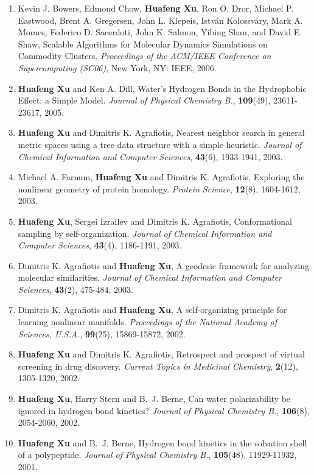 \documentclass[11pt]{article}
\begin{document}
\begin{enumerate}
\item
Kevin J. Bowers, Edmond Chow, \textbf{Huafeng Xu}, Ron O. Dror, Michael P. Eastwood, Brent A. Gregersen, John L. Klepeis, István Kolossváry, Mark A. Moraes, Federico D. Sacerdoti, John K. Salmon, Yibing Shan, and David E. Shaw, Scalable Algorithms for Molecular Dynamics Simulations on Commodity Clusters. \textit{Proceedings of the ACM/IEEE Conference on Supercomputing (SC06)}, New York, NY: IEEE, 2006.
\item
\textbf{Huafeng Xu} and Ken A. Dill, Water's Hydrogen Bonds in the Hydrophobic Effect: a Simple Model. \textit{Journal of Physical Chemistry B.}, \textbf{109}(49), 23611-23617, 2005.
\item
\textbf{Huafeng Xu} and Dimitris K. Agrafiotis, Nearest neighbor search in general metric spaces using a tree data structure with a simple heuristic. \textit{Journal of Chemical Information and Computer Sciences}, \textbf{43}(6), 1933-1941, 2003.
\item
Michael A. Farnum, \textbf{Huafeng Xu} and Dimitris K. Agrafiotis, Exploring the nonlinear geometry of protein homology. \textit{Protein Science}, \textbf{12}(8), 1604-1612, 2003.
\item
\textbf{Huafeng Xu}, Sergei Izrailev and Dimitris K. Agrafiotis, Conformational sampling by self-organization. \textit{Journal of Chemical Information and Computer Sciences}, \textbf{43}(4), 1186-1191, 2003.
\item
Dimitris K. Agrafiotis and \textbf{Huafeng Xu}, A geodesic framework for analyzing molecular similarities. \textit{Journal of Chemical Information and Computer Sciences}, \textbf{43}(2), 475-484, 2003.
\item
Dimitris K. Agrafiotis and \textbf{Huafeng Xu}, A self-organizing principle for learning nonlinear manifolds. \textit{Proceedings of the National Academy of Sciences, U.S.A.}, \textbf{99}(25), 15869-15872, 2002.
\item
\textbf{Huafeng Xu} and Dimitris K. Agrafiotis, Retrospect and prospect of virtual screening in drug discovery. \textit{Current Topics in Medicinal Chemistry}, \textbf{2}(12), 1305-1320, 2002.
\item
\textbf{Huafeng Xu}, Harry Stern and B.~J. Berne, Can water polarizability be ignored in hydrogen bond kinetics? \textit{Journal of Physical Chemistry B.}, \textbf{106}(8), 2054-2060, 2002.
\item
\textbf{Huafeng Xu} and B.~J. Berne, Hydrogen bond kinetics in the solvation shell of a polypeptide. \textit{Journal of Physical Chemistry B.}, \textbf{105}(48), 11929-11932, 2001.

\end{enumerate}
\end{document}
